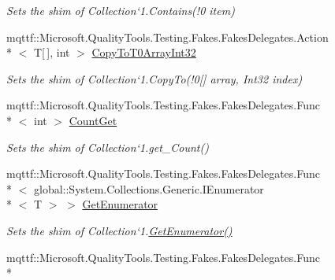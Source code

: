 \begin{DoxyCompactItemize}
\begin{DoxyCompactList}\small\item\em Sets the shim of Collection`1.Contains(!0 item)\end{DoxyCompactList}\item 
mqttf\-::\-Microsoft.\-Quality\-Tools.\-Testing.\-Fakes.\-Fakes\-Delegates.\-Action\\*
$<$ T\mbox{[}$\,$\mbox{]}, int $>$ \hyperlink{class_system_1_1_collections_1_1_object_model_1_1_fakes_1_1_shim_collection_3_01_t_01_4_a866159f17334258c3f239ff47af566b3}{Copy\-To\-T0\-Array\-Int32}
\begin{DoxyCompactList}\small\item\em Sets the shim of Collection`1.Copy\-To(!0\mbox{[}\mbox{]} array, Int32 index)\end{DoxyCompactList}\item 
mqttf\-::\-Microsoft.\-Quality\-Tools.\-Testing.\-Fakes.\-Fakes\-Delegates.\-Func\\*
$<$ int $>$ \hyperlink{class_system_1_1_collections_1_1_object_model_1_1_fakes_1_1_shim_collection_3_01_t_01_4_a2bc8ea3552d6427d282d74d7c80eba87}{Count\-Get}
\begin{DoxyCompactList}\small\item\em Sets the shim of Collection`1.get\-\_\-\-Count()\end{DoxyCompactList}\item 
mqttf\-::\-Microsoft.\-Quality\-Tools.\-Testing.\-Fakes.\-Fakes\-Delegates.\-Func\\*
$<$ global\-::\-System.\-Collections.\-Generic.\-I\-Enumerator\\*
$<$ T $>$ $>$ \hyperlink{class_system_1_1_collections_1_1_object_model_1_1_fakes_1_1_shim_collection_3_01_t_01_4_a61fd9b444d192f1d14a4c82d6c7f905e}{Get\-Enumerator}
\begin{DoxyCompactList}\small\item\em Sets the shim of Collection`1.\hyperlink{class_system_1_1_collections_1_1_object_model_1_1_fakes_1_1_shim_collection_3_01_t_01_4_a61fd9b444d192f1d14a4c82d6c7f905e}{Get\-Enumerator()}\end{DoxyCompactList}\item 
mqttf\-::\-Microsoft.\-Quality\-Tools.\-Testing.\-Fakes.\-Fakes\-Delegates.\-Func\\*

\end{DoxyCompactItemize}
